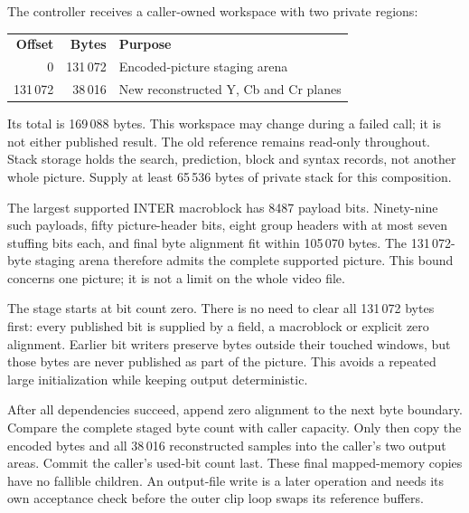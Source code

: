 The controller receives a caller-owned workspace with two private regions:
\begin{center}
  \begin{tabular}{rrl}
    \textbf{Offset} & \textbf{Bytes} & \textbf{Purpose}                      \\
    0               & 131\,072       & Encoded-picture staging arena         \\
    131\,072        & 38\,016        & New reconstructed Y, Cb and Cr planes
  \end{tabular}
\end{center}
Its total is 169\,088 bytes. This workspace may change during a failed call;
it is not either published result. The old reference remains read-only throughout.
Stack storage holds the search, prediction, block and syntax records, not another
whole picture. Supply at least 65\,536 bytes of private stack for this composition.

The largest supported INTER macroblock has 8487 payload bits. Ninety-nine such
payloads, fifty picture-header bits, eight group headers with at most seven
stuffing bits each, and final byte alignment fit within 105\,070 bytes. The
131\,072-byte staging arena therefore admits the complete supported picture.
This bound concerns one picture; it is not a limit on the whole video file.

The stage starts at bit count zero. There is no need to clear all 131\,072 bytes
first: every published bit is supplied by a field, a macroblock or explicit zero
alignment. Earlier bit writers preserve bytes outside their touched windows, but
those bytes are never published as part of the picture. This avoids a repeated
large initialization while keeping output deterministic.

After all dependencies succeed, append zero alignment to the next byte boundary.
Compare the complete staged byte count with caller capacity. Only then copy the
encoded bytes and all 38\,016 reconstructed samples into the caller's two output
areas. Commit the caller's used-bit count last. These final mapped-memory copies
have no fallible children. An output-file write is a later operation and needs its
own acceptance check before the outer clip loop swaps its reference buffers.
